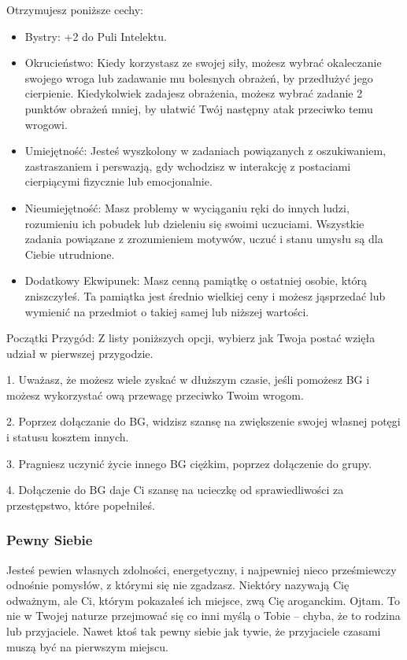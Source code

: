 Otrzymujesz poniższe cechy:
\begin{itemize}
    \item  Bystry: +2 do Puli Intelektu.
    \item  Okrucieństwo: Kiedy korzystasz ze swojej siły, możesz wybrać okaleczanie swojego wroga lub zadawanie mu bolesnych obrażeń, by przedłużyć jego cierpienie. Kiedykolwiek zadajesz obrażenia, możesz wybrać zadanie 2 punktów obrażeń mniej, by ułatwić Twój następny atak przeciwko temu wrogowi.
    \item  Umiejętność: Jesteś wyszkolony w zadaniach powiązanych z oszukiwaniem, zastraszaniem i perswazją, gdy wchodzisz w interakcję z postaciami cierpiącymi fizycznie lub emocjonalnie. 
    \item  Nieumiejętność: Masz problemy w wyciąganiu ręki do innych ludzi, rozumieniu ich pobudek lub dzieleniu się swoimi uczuciami. Wszystkie zadania powiązane z zrozumieniem motywów, uczuć i stanu umysłu są dla Ciebie utrudnione.
    \item  Dodatkowy Ekwipunek: Masz cenną pamiątkę o ostatniej osobie, którą zniszczyłeś. Ta pamiątka jest średnio wielkiej ceny i możesz jąsprzedać lub wymienić na przedmiot o takiej samej lub niższej wartości.
\end{itemize}

Początki Przygód: Z listy poniższych opcji, wybierz jak Twoja postać wzięła udział w pierwszej przygodzie.

1. Uważasz, że możesz wiele zyskać w dłuższym czasie, jeśli pomożesz BG i możesz wykorzystać ową przewagę przeciwko Twoim wrogom.

2. Poprzez dołączanie do BG, widzisz szansę na zwiększenie swojej własnej potęgi i statusu kosztem innych.

3. Pragniesz uczynić życie innego BG ciężkim, poprzez dołączenie do grupy.

4. Dołączenie do BG daje Ci szansę na ucieczkę od sprawiedliwości za przestępstwo, które popełniłeś. 

\subsubsection{Pewny Siebie}

Jesteś pewien własnych zdolności, energetyczny, i najpewniej nieco prześmiewczy odnośnie pomysłów, z którymi się nie zgadzasz.  Niektóry nazywają Cię odważnym, ale Ci, którym pokazałeś ich miejsce, zwą Cię aroganckim. Ojtam. To nie w Twojej naturze przejmować się co inni myślą o Tobie – chyba, że to rodzina lub przyjaciele. Nawet ktoś tak pewny siebie jak tywie, że przyjaciele czasami muszą być na pierwszym miejscu.

